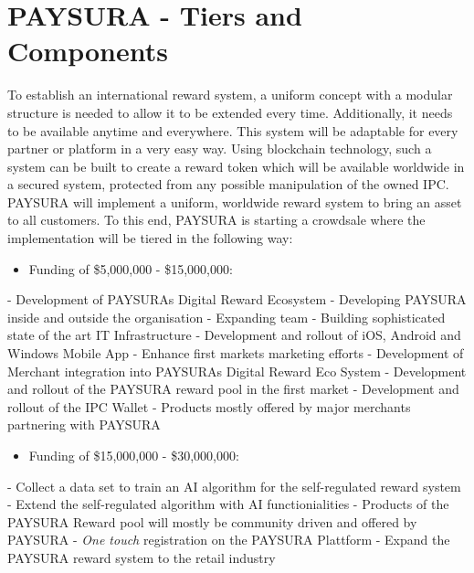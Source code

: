 \documentclass[twoside,onecolumn]{article}
\begin{document}
\section{PAYSURA - Tiers and Components}

To establish an international reward system, a uniform concept with a modular structure is needed to allow it to be extended every time. Additionally, it needs to be available anytime and everywhere. This system will be adaptable for every partner or platform in a very easy way. Using blockchain technology, such a system can be built to create a reward token which will be available worldwide in a secured system, protected from any possible manipulation of the owned IPC. PAYSURA will implement a uniform, worldwide reward system to bring an asset to all customers. To this end, PAYSURA is starting a crowdsale where the implementation will be tiered in the following way:
\begin{itemize}
\item Funding of \$5,000,000 - \$15,000,000:
\end{itemize}
- Development of PAYSURAs Digital Reward Ecosystem\newline
- Developing PAYSURA inside and outside the organisation \newline
- Expanding team\newline
- Building sophisticated state of the art IT Infrastructure\newline
- Development and rollout of iOS, Android and Windows Mobile App\newline
- Enhance first markets marketing efforts\newline
- Development of Merchant integration into PAYSURAs Digital Reward Eco System \newline
- Development and rollout of the PAYSURA reward pool in the first market\newline
- Development and rollout of the IPC Wallet \newline
- Products mostly offered by major merchants partnering with PAYSURA\newline

\begin{itemize}
\item Funding of \$15,000,000 - \$30,000,000:
\end{itemize}
- Collect a data set to train an AI algorithm for the self-regulated reward system\newline
- Extend the self-regulated algorithm with AI functionialities \newline
- Products of the PAYSURA Reward pool will mostly be community driven and offered by PAYSURA \newline
- \textit{One touch} registration on the PAYSURA Plattform \newline
- Expand the PAYSURA reward system to the retail industry \newline
\\
\end{document}
